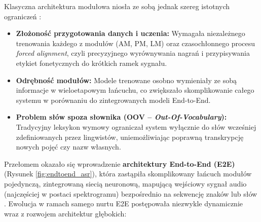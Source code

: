 Klasyczna architektura modułowa niosła ze sobą jednak szereg istotnych ograniczeń \cite[s.~315--316]{pondel2024e2e}:
\begin{itemize}
\item \textbf{Złożoność przygotowania danych i uczenia:} Wymagała niezależnego trenowania każdego z modułów (AM, PM, LM) oraz czasochłonnego procesu \textit{forced alignment}, czyli precyzyjnego wyrównywania nagrań i przypisywania etykiet fonetycznych do krótkich ramek sygnału.

\item \textbf{Odrębność modułów:} Modele trenowane osobno wymieniały ze sobą informacje w wieloetapowym łańcuchu, co zwiększało skomplikowanie całego systemu w porównaniu do zintegrowanych modeli End-to-End.

\item \textbf{Problem słów spoza słownika (OOV -- \textit{Out-Of-Vocabulary}):} Tradycyjny leksykon wymowy ograniczał system wyłącznie do słów wcześniej zdefiniowanych przez lingwistów, uniemożliwiając poprawną transkrypcję nowych pojęć czy nazw własnych.
\end{itemize}
    Przełomem okazało się wprowadzenie \textbf{architektury End-to-End (E2E)} (Rysunek \ref{fig:endtoend_asr}), która zastąpiła skomplikowany łańcuch modułów pojedynczą, zintegrowaną siecią neuronową, mapującą wejściowy sygnał audio (najczęściej w postaci spektrogramu) bezpośrednio na sekwencję znaków lub słów \cite[s.~315--316]{pondel2024e2e}. Ewolucja w ramach samego nurtu E2E postępowała niezwykle dynamicznie wraz z rozwojem architektur głębokich:
